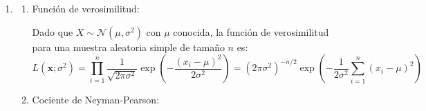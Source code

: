 \begin{enumerate}[label=\color{red}\textbf{\arabic*)}]
\begin{enumerate}[label=\color{red}\textbf{\alph*)}]
\begin{enumerate}[label=\arabic*)]
			                  Dado que la región de rechazo está en la cola superior: \[
				                  p\text{-valor}=P_{\theta=2}(T\ge 37.3)=P(\chi_{40}^2\ge 149.2)
			                  \]
			                  \textit{(Sabiendo que la media de una $\chi_{40}^2$ es 40, el valor 149.2 está extremandamente alejado en la cola derecha, por lo que $p$-valor $\approx 0$).}
			            \item Dos criterio de decisión:
			                  \begin{itemize}[label=\textbullet]
				                  \item \textbf{Via $p$-valor:} Como $p$-valor $\approx 0<\alpha=0.05$, existe evidencia abrumadora para \textbf{rechazar la hipótesis nula $H_0$} en favor de la alternativa.
				                  \item \textbf{Via Región Crítica:} Calculamos la región de rechazo buscando el cuantil superior $\chi_{40,0.05}^2$ (aproximadamente $55.76$). Puesto que el estadístico $149.2\ge 55.76$, cae plenamente dentro de la región de rechazo $S_1$, decidiendo \textbf{rechazar $H_0$}.
			                  \end{itemize}
		            \end{enumerate}
	      \end{enumerate}
	\item {}

	      \begin{enumerate}[label=\arabic*)]
		      \item Función de verosimilitud:

		            Dado que $X\sim \mathcal{N}(\mu,\sigma^2)$ con $\mu$ conocida, la función de verosimilitud para una muestra aleatoria simple de tamaño $n$ es: \[
			            L(\mathbf{x};\sigma^2)=\prod_{i=1}^{n} \dfrac{1}{\sqrt{2\pi\sigma^2} }\exp \left( -\dfrac{(x_{i}-\mu)^2}{2\sigma^2} \right) =(2\pi\sigma^2)^{-n / 2}\exp \left( -\dfrac{1}{2\sigma^2} \sum_{i=1}^{n} (x_{i}-\mu)^2\right)
		            \]
		      \item Cociente de Neyman-Pearson:


\end{enumerate}
\end{enumerate}
